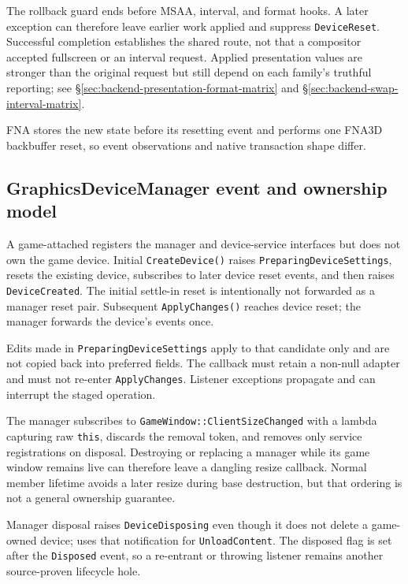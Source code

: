 The rollback guard ends before MSAA, interval, and format hooks. A later exception can therefore
leave earlier work applied and suppress \texttt{DeviceReset}. Successful completion establishes
the shared route, not that a compositor accepted fullscreen or an interval request. Applied
presentation values are stronger than the original request but still depend on each family's
truthful reporting; see \S\ref{sec:backend-presentation-format-matrix} and
\S\ref{sec:backend-swap-interval-matrix}.

FNA stores the new state before its resetting event and performs one FNA3D backbuffer reset, so
event observations and native transaction shape differ.

\subsection{GraphicsDeviceManager event and ownership model}

A game-attached  registers the manager and device-service
interfaces but does not own the game device. Initial \texttt{CreateDevice()} raises
\texttt{PreparingDeviceSettings}, resets the existing device, subscribes to later device reset
events, and then raises \texttt{DeviceCreated}. The initial settle-in reset is intentionally not
forwarded as a manager reset pair. Subsequent \texttt{ApplyChanges()} reaches device reset; the
manager forwards the device's events once.

Edits made in \texttt{PreparingDeviceSettings} apply to that candidate only and are not copied
back into preferred fields. The callback must retain a non-null adapter and must not re-enter
\texttt{ApplyChanges}. Listener exceptions propagate and can interrupt the staged operation.

The manager subscribes to \texttt{GameWindow::ClientSizeChanged} with a lambda capturing raw
\texttt{this}, discards the removal token, and removes only service registrations on disposal.
Destroying or replacing a manager while its game window remains live can therefore leave a
dangling resize callback. Normal member lifetime avoids a later resize during base destruction,
but that ordering is not a general ownership guarantee.

Manager disposal raises \texttt{DeviceDisposing} even though it does not delete a game-owned
device;  uses that notification for \texttt{UnloadContent}. The disposed flag is
set after the \texttt{Disposed} event, so a re-entrant or throwing listener remains another
source-proven lifecycle hole.

